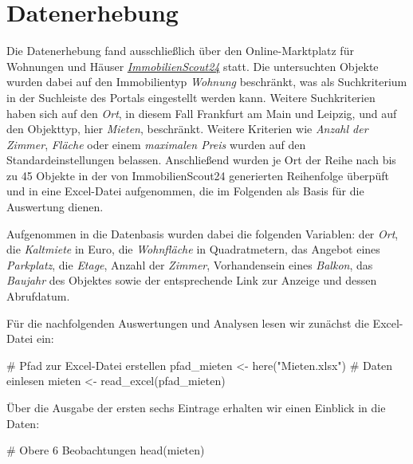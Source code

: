 \documentclass[
  a4paper,
  DIV=11]{scrartcl}
\newenvironment{Shaded}{\begin{snugshade}}{\end{snugshade}}
\newcommand{\CommentTok}[1]{\textcolor[rgb]{0.37,0.37,0.37}{#1}}
\newcommand{\FunctionTok}[1]{\textcolor[rgb]{0.28,0.35,0.67}{#1}}
\newcommand{\NormalTok}[1]{\textcolor[rgb]{0.00,0.23,0.31}{#1}}
\newcommand{\OtherTok}[1]{\textcolor[rgb]{0.00,0.23,0.31}{#1}}
\newcommand{\StringTok}[1]{\textcolor[rgb]{0.13,0.47,0.30}{#1}}
\begin{document}
\hypertarget{datenerhebung}{%
\section{Datenerhebung}\label{datenerhebung}}

Die Datenerhebung fand ausschließlich über den Online-Marktplatz für
Wohnungen und Häuser
\emph{\href{https://www.immobilienscout24.de/}{ImmobilienScout24}}
statt. Die untersuchten Objekte wurden dabei auf den Immobilientyp
\emph{Wohnung} beschränkt, was als Suchkriterium in der Suchleiste des
Portals eingestellt werden kann. Weitere Suchkriterien haben sich auf
den \emph{Ort}, in diesem Fall Frankfurt am Main und Leipzig, und auf
den Objekttyp, hier \emph{Mieten}, beschränkt. Weitere Kriterien wie
\emph{Anzahl der Zimmer}, \emph{Fläche} oder einem \emph{maximalen
Preis} wurden auf den Standardeinstellungen belassen. Anschließend
wurden je Ort der Reihe nach bis zu 45 Objekte in der von
ImmobilienScout24 generierten Reihenfolge überpüft und in eine
Excel-Datei aufgenommen, die im Folgenden als Basis für die Auswertung
dienen.

Aufgenommen in die Datenbasis wurden dabei die folgenden Variablen: der
\emph{Ort}, die \emph{Kaltmiete} in Euro, die \emph{Wohnfläche} in
Quadratmetern, das Angebot eines \emph{Parkplatz}, die \emph{Etage},
Anzahl der \emph{Zimmer}, Vorhandensein eines \emph{Balkon}, das
\emph{Baujahr} des Objektes sowie der entsprechende Link zur Anzeige und
dessen Abrufdatum.

Für die nachfolgenden Auswertungen und Analysen lesen wir zunächst die
Excel-Datei ein:

\begin{Shaded}
\begin{Highlighting}[]
\CommentTok{\# Pfad zur Excel{-}Datei erstellen}
\NormalTok{pfad\_mieten }\OtherTok{\textless{}{-}} \FunctionTok{here}\NormalTok{(}\StringTok{"Mieten.xlsx"}\NormalTok{)}
\CommentTok{\# Daten einlesen}
\NormalTok{mieten }\OtherTok{\textless{}{-}} \FunctionTok{read\_excel}\NormalTok{(pfad\_mieten)}
\end{Highlighting}
\end{Shaded}

Über die Ausgabe der ersten sechs Eintrage erhalten wir einen Einblick
in die Daten:

\begin{Shaded}
\begin{Highlighting}[]
\CommentTok{\# Obere 6 Beobachtungen}
\FunctionTok{head}\NormalTok{(mieten)}
\end{Highlighting}
\end{Shaded}
\end{document}
